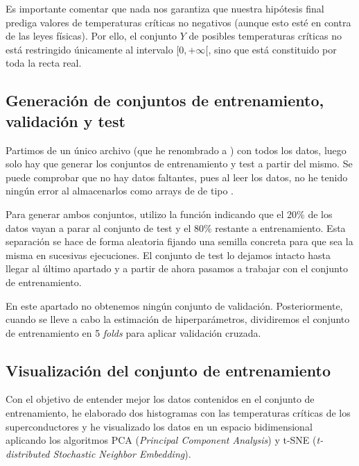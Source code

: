 \documentclass[10pt,a4paper]{article}
\begin{document}
Es importante comentar que nada nos garantiza que nuestra hipótesis final prediga valores de temperaturas críticas no negativos (aunque esto esté en contra de las leyes físicas). Por ello, el conjunto $Y$ de posibles temperaturas críticas no está restringido únicamente al intervalo $[0,+\infty[$, sino que está constituido por toda la recta real.






\subsection{Generación de conjuntos de entrenamiento, validación y test}

Partimos de un único archivo  (que he renombrado a ) con todos los datos, luego solo hay que generar los conjuntos de entrenamiento y test a partir del mismo. Se puede comprobar que no hay datos faltantes, pues al leer los datos, no he tenido ningún error al almacenarlos como arrays de  de tipo .

Para generar ambos conjuntos, utilizo la función  indicando que el 20\% de los datos vayan a parar al conjunto de test y el 80\% restante a entrenamiento. Esta separación se hace de forma aleatoria fijando una semilla concreta para que sea la misma en sucesivas ejecuciones. El conjunto de test lo dejamos intacto hasta llegar al último apartado y a partir de ahora pasamos a trabajar con el conjunto de entrenamiento.

En este apartado no obtenemos ningún conjunto de validación. Posteriormente, cuando se lleve a cabo la estimación de hiperparámetros, dividiremos el conjunto de entrenamiento en 5 \textit{folds} para aplicar validación cruzada.




\subsection{Visualización del conjunto de entrenamiento}

Con el objetivo de entender mejor los datos contenidos en el conjunto de entrenamiento, he elaborado dos histogramas con las temperaturas críticas de los superconductores y he visualizado los datos en un espacio bidimensional aplicando los algoritmos PCA (\textit{Principal Component Analysis}) y t-SNE (\textit{t-distributed Stochastic Neighbor Embedding}).
\end{document}
